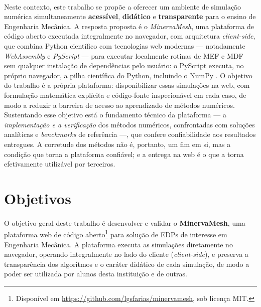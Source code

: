 \paragraph{}Neste contexto, este trabalho se propõe a oferecer um ambiente de simulação numérica simultaneamente \textbf{acessível}, \textbf{didático} e \textbf{transparente} para o ensino de Engenharia Mecânica. A resposta proposta é o \textit{MinervaMesh}, uma plataforma de código aberto executada integralmente no navegador, com arquitetura \textit{client-side}, que combina Python científico com tecnologias web modernas --- notadamente \textit{WebAssembly} e \textit{PyScript} --- para executar localmente rotinas de MEF e MDF sem qualquer instalação de dependências pelo usuário: o PyScript \cite{PyScript2023} executa, no próprio navegador, a pilha científica do Python, incluindo o NumPy \cite{Harris2020}. O objetivo do trabalho é a própria plataforma: disponibilizar essas simulações na web, com formulação matemática explícita e código-fonte inspecionável em cada caso, de modo a reduzir a barreira de acesso ao aprendizado de métodos numéricos. Sustentando esse objetivo está o fundamento técnico da plataforma --- a \textit{implementação e a verificação} dos métodos numéricos, confrontadas com soluções analíticas e \textit{benchmarks} de referência ---, que confere confiabilidade aos resultados entregues. A corretude dos métodos não é, portanto, um fim em si, mas a condição que torna a plataforma confiável; e a entrega na web é o que a torna efetivamente utilizável por terceiros.

\section{Objetivos}

\paragraph{}O objetivo geral deste trabalho é desenvolver e validar o \textbf{MinervaMesh}, uma plataforma web de código aberto\footnote{Disponível em \url{https://github.com/lgsfarias/minervamesh}, sob licença MIT.} para solução de EDPs de interesse em Engenharia Mecânica. A plataforma executa as simulações diretamente no navegador, operando integralmente no lado do cliente (\textit{client-side}), e preserva a transparência dos algoritmos e o caráter didático de cada simulação, de modo a poder ser utilizada por alunos desta instituição e de outras.

